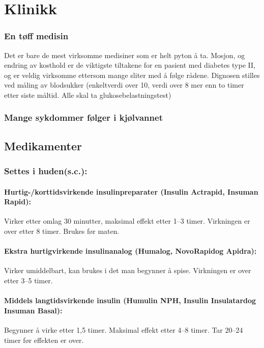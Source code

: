 		\section{Klinikk}
			\subsubsection{En tøff medisin}
				Det er bare de mest virksomme medisiner som er helt pyton å ta. Mosjon, og endring av kosthold er de viktigste tiltakene for en pasient med diabetes type II, og er veldig virksomme ettersom mange sliter med å følge rådene. Dignosen stilles ved måling av blodsukker (enkeltverdi over 10, verdi over 8 mer enn to timer etter siste måltid. Alle skal ta glukosebelastningstest)
			\subsubsection{Mange sykdommer følger i kjølvannet}
		\subsection{Medikamenter}
				\subsubsection{Settes i huden(s.c.):}
					\paragraph{Hurtig-/korttidsvirkende insulinpreparater (Insulin Actrapid\textregistered, Insuman Rapid\textregistered):\\}Virker etter omlag 30 minutter, maksimal effekt etter 1–3 timer. Virkningen er over etter 8 timer. Brukes før maten\cite{legevakthandboka}.

					\paragraph{Ekstra hurtigvirkende insulinanalog (Humalog\textregistered, NovoRapid\textregistered og Apidra\textregistered):}Virker  umiddelbart, kan brukes i det man begynner å spise. Virkningen er over etter 3–5 timer\cite{legevakthandboka}.

					\paragraph{Middels langtidsvirkende insulin (Humulin NPH\textregistered, Insulin Insulatard\textregistered og Insuman Basal\textregistered):\\}Begynner å virke etter 1,5 timer. Maksimal effekt etter 4–8 timer. Tar 20–24 timer før effekten er over\cite{legevakthandboka}.

